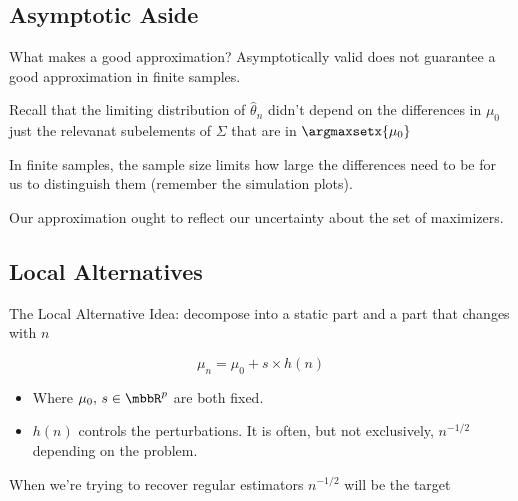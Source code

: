 \documentclass[aspectratio=169, professionalfonts]{beamer}
\begin{document}




\subsection{Asymptotic Aside}

\begin{frame}{What makes a good approximation?}
	Asymptotically valid does not guarantee a good approximation in finite
	samples.

	\vfill


	Recall that the limiting distribution of $\widehat{\theta}_n$ didn't depend on
	the differences in $\mu_0$ just the relevanat subelements of $\Sigma$ that are in $\argmaxsetx{\mu_0}$


	\vfill
	In finite samples, the sample size limits how large the differences
	need to be for us to distinguish them (remember the simulation plots).

	\vfill

	Our approximation ought to reflect our uncertainty about the set
	of 	maximizers.

\end{frame}

\subsection{Local Alternatives}
\begin{frame}{The Local Alternative}
	Idea: decompose into a static part and a part that changes with $n$

	$$\mu_n = \mu_0 + s \times h(n)$$
	\begin{itemize}
		\item Where $\mu_0, \,s \in \mbbR^{p}$ are both fixed.
		      \vfill
		\item $h(n)$ controls the perturbations. It is often, but not
		      exclusively, $n^{-1/2}$ depending on the problem.
	\end{itemize}
	\vfill

	When we're trying to recover regular estimators $n^{-1/2}$ will be the target

\end{frame}
\end{document}
